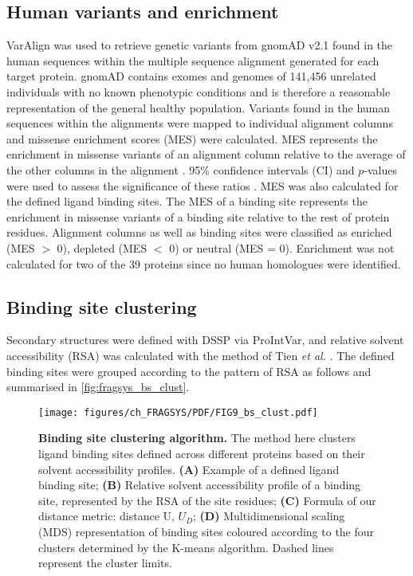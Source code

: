 \subsection{Human variants and enrichment}

VarAlign \cite{MACGOWAN_2020_DRSASP} was used to retrieve genetic variants from gnomAD v2.1 \cite{KARCZEWSKI_2020_GNOMAD} found in the human sequences within the multiple sequence alignment generated for each target protein. gnomAD contains exomes and genomes of 141,456 unrelated individuals with no known phenotypic conditions and is therefore a reasonable representation of the general healthy population. Variants found in the human sequences within the alignments were mapped to individual alignment columns and missense enrichment scores (MES) were calculated. MES represents the enrichment in missense variants of an alignment column relative to the average of the other columns in the alignment \cite{MACGOWAN_2017_VARIANTS, MACGOWAN_2024_VARIANTS}. 95\% confidence intervals (CI) and $p$-values were used to assess the significance of these ratios \cite{SZUMILAS_2010_ODDSRATIOS}. MES was also calculated for the defined ligand binding sites. The MES of a binding site represents the enrichment in missense variants of a binding site relative to the rest of protein residues. Alignment columns as well as binding sites were classified as enriched (MES $>$ 0), depleted (MES $<$ 0) or neutral (MES = 0). Enrichment was not calculated for two of the 39 proteins since no human homologues were identified.

\subsection{Binding site clustering}

Secondary structures were defined with DSSP \cite{KABSCH_1983_DSSP} via ProIntVar, and relative solvent accessibility (RSA) was calculated with the method of  Tien \textit{et al.} \cite{TIEN_2013_RSA}. The defined binding sites were grouped according to the pattern of RSA as follows and summarised in \autoref{fig:fragsys_bs_clust}.

\begin{figure}[ht!]
    \centering
    \texttt{[image: figures/ch\_FRAGSYS/PDF/FIG9\_bs\_clust.pdf]}
    \caption[Binding site clustering algorithm]{\textbf{Binding site clustering algorithm.} The method here clusters ligand binding sites defined across different proteins based on their solvent accessibility profiles. \textbf{(A)} Example of a defined ligand binding site; \textbf{(B)} Relative solvent accessibility profile of a binding site, represented by the RSA of the site residues; \textbf{(C)} Formula of our distance metric: distance U, $U_{D}$; \textbf{(D)} Multidimensional scaling (MDS) representation of binding sites coloured according to the four clusters determined by the K-means algorithm. Dashed lines represent the cluster limits.}
    \label{fig:fragsys_bs_clust}
\end{figure}

